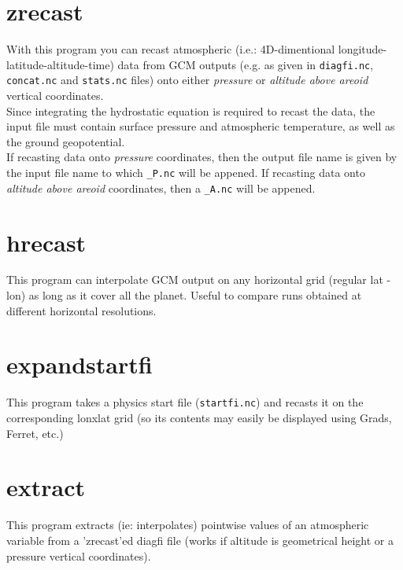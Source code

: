 \section{zrecast}
With this program you can recast atmospheric (i.e.: 4D-dimentional
longitude-latitude-altitude-time) data from GCM outputs (e.g. as given in
{\tt diagfi.nc}, {\tt concat.nc} and {\tt stats.nc} files) onto
either {\it pressure} or {\it altitude above areoid} vertical coordinates.\\
Since integrating the hydrostatic equation is required to recast the data,
the input file must contain surface pressure and atmospheric temperature,
as well as the ground geopotential.\\
If recasting data onto {\it pressure} coordinates, then the output file name
is given by the input file name to which {\tt\_P.nc} will be appened.
If recasting data onto {\it altitude above areoid} coordinates, then a
{\tt\_A.nc} will be appened.

\section{hrecast}
This program can interpolate GCM output on any horizontal grid
(regular lat - lon) as long as it cover all the
planet. Useful to compare runs obtained at different horizontal resolutions.

\section{expandstartfi}
This program takes a physics start file ({\tt startfi.nc}) and recasts it
on the corresponding  lonxlat grid (so its contents may easily be displayed
using Grads, Ferret, etc.)

\section{extract}
This program extracts (ie: interpolates) pointwise values of an atmospheric 
variable from a 'zrecast'ed diagfi file (works if altitude is geometrical 
height or a pressure vertical coordinates).

